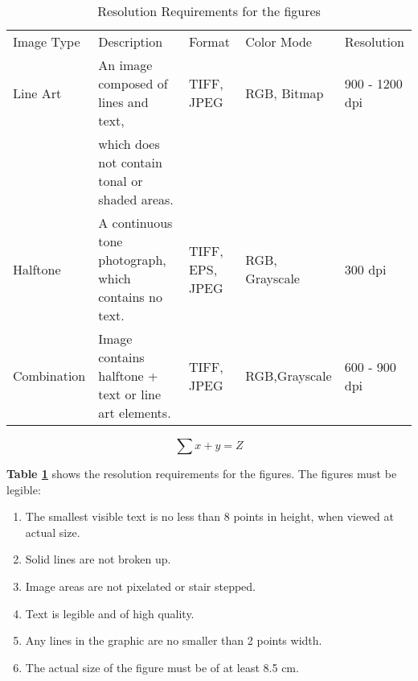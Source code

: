 \begin{table}
\caption{Resolution Requirements for the figures\label{Tab:02}}
\begin{tabular}{lllll}
Image Type & Description & Format & Color Mode & Resolution\\
Line Art & An image composed of lines and text,  & TIFF, JPEG & RGB, Bitmap & 900 - 1200 dpi\\
           & which does not contain tonal or shaded areas.& & &\\
           Halftone & A continuous tone photograph, which contains no text. & TIFF, EPS, JPEG & RGB, Grayscale & 300 dpi\\
Combination & Image contains halftone + text or line art elements. & TIFF, JPEG & RGB,Grayscale & 600 - 900 dpi\\
\end{tabular}
\end{table}

\begin{equation}
\sum x+ y =Z\label{eq:01}
\end{equation}

\textbf{Table \ref{Tab:02}} shows the resolution requirements for the figures. The figures must be legible:
\begin{enumerate}
\item The smallest visible text is no less than 8 points in height, when viewed at actual size.
\item Solid lines are not broken up.
\item Image areas are not pixelated or stair stepped.
\item Text is legible and of high quality.
\item Any lines in the graphic are no smaller than 2 points width.
\item The actual size of the figure must be of at least 8.5 cm.
\end{enumerate}
